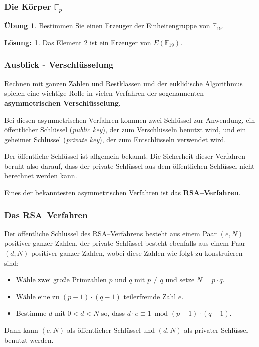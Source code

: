 \documentclass[hyperref={pdfpagelabels=false}]{beamer}
\theoremstyle{plain}%
\theoremstyle{definition}
\newtheorem*{uebung}{Übung}
\newtheorem*{sol}{Lösung:}
\theoremstyle{remark}
\def \F{\mathbb F}
\begin{document}
\begin{frame}
\frametitle{Die Körper $\F_p$}

\begin{uebung}
Bestimmen Sie einen Erzeuger der Einheitengruppe von $\F_{19}$.
\end{uebung}

\bigbreak

\pause \pause 

\begin{sol}
Das Element $2$ ist ein Erzeuger von $E(\F_{19})$. 
\end{sol}
\end{frame}

\begin{frame}
\frametitle{Ausblick - Verschlüsselung} 

Rechnen mit ganzen Zahlen und Restklassen und der euklidische Algorithmus spielen 
eine wichtige Rolle in vielen Verfahren der sogenannenten \textbf{asymmetrischen Verschlüsselung}. 

\pause 

Bei diesen asymmetrischen Verfahren kommen zwei Schlüssel zur Anwendung,  ein öffentlicher 
Schlüssel (\textit{public key}), der zum Verschlüsseln benutzt wird, 
und ein geheimer Schlüssel (\textit{private key}), der zum Entschlüsseln verwendet wird.

\pause 

Der öffentliche Schlüssel ist allgemein bekannt. Die Sicherheit dieser Verfahren beruht also darauf, dass der 
private Schlüssel aus dem öffentlichen Schlüssel nicht berechnet werden kann.  

\pause 

\bigbreak

Eines der bekanntesten asymmetrischen Verfahren ist das \textbf{RSA--Verfahren}.

\end{frame}

\begin{frame}
\frametitle{Das RSA--Verfahren}

Der öffentliche Schlüssel des RSA--Verfahrens besteht aus einem Paar $(e,N)$ positiver ganzer Zahlen, 
der private Schlüssel besteht ebenfalls aus einem Paar $(d,N)$ positiver ganzer Zahlen, wobei diese 
Zahlen wie folgt zu konstruieren sind: 

\pause

\begin{itemize}
\item<2-> Wähle zwei große Primzahlen $p$ und $q$ mit $p \neq q$ und setze $N = p \cdot q$. 
\item<3-> Wähle eine zu $(p-1) \cdot (q-1)$ teilerfremde Zahl $e$. 
\item<4-> Bestimme $d$ mit $0 < d < N$ so, dass $d \cdot e \equiv 1 \, \text{ mod } (p-1) \cdot (q-1)$. 
\end{itemize}

\pause \pause \pause 
Dann kann $(e,N)$ als öffentlicher Schlüssel und $(d,N)$ als privater Schlüssel benutzt werden.  

\end{frame} 
\end{document}
